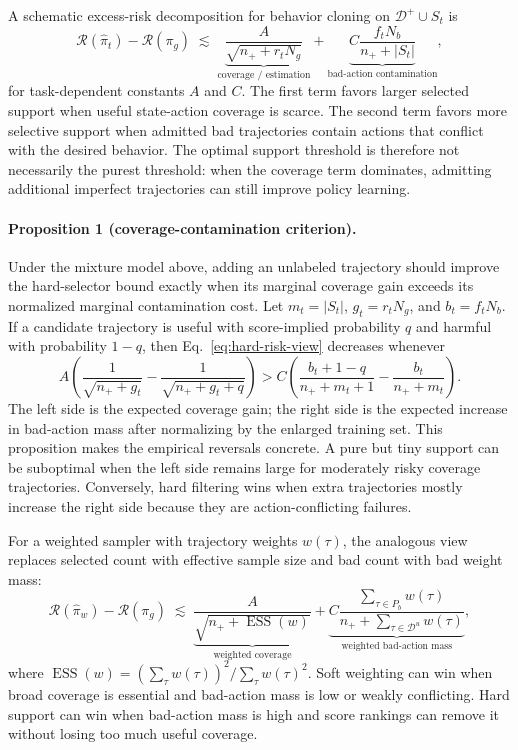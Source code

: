 \documentclass{article}
\newcommand{\Dpos}{\mathcal{D}^{+}}
\newcommand{\Dunl}{\mathcal{D}^{u}}
\begin{document}
A schematic excess-risk decomposition for behavior cloning on $\Dpos\cup S_t$ is
\begin{equation}
  \mathcal{R}(\hat{\pi}_t) - \mathcal{R}(\pi_g)
  \;\lesssim\;
  \underbrace{\frac{A}{\sqrt{n_+ + r_tN_g}}}_{\text{coverage / estimation}}
  +
  \underbrace{
  C\frac{f_tN_b}{n_+ + |S_t|}
  }_{\text{bad-action contamination}},
  \label{eq:hard-risk-view}
\end{equation}
for task-dependent constants $A$ and $C$. The first term favors larger selected support when useful state-action coverage is scarce. The second term favors more selective support when admitted bad trajectories contain actions that conflict with the desired behavior. The optimal support threshold is therefore not necessarily the purest threshold: when the coverage term dominates, admitting additional imperfect trajectories can still improve policy learning.

\paragraph{Proposition 1 (coverage-contamination criterion).}
Under the mixture model above, adding an unlabeled trajectory should improve the hard-selector bound exactly when its marginal coverage gain exceeds its normalized marginal contamination cost. Let $m_t=|S_t|$, $g_t=r_tN_g$, and $b_t=f_tN_b$. If a candidate trajectory is useful with score-implied probability $q$ and harmful with probability $1-q$, then Eq.~\ref{eq:hard-risk-view} decreases whenever
\begin{equation}
  A\left(
  \frac{1}{\sqrt{n_+ + g_t}} -
  \frac{1}{\sqrt{n_+ + g_t + q}}
  \right)
  >
  C\left(
  \frac{b_t + 1 - q}{n_+ + m_t + 1} -
  \frac{b_t}{n_+ + m_t}
  \right).
  \label{eq:marginal-support}
\end{equation}
The left side is the expected coverage gain; the right side is the expected increase in bad-action mass after normalizing by the enlarged training set. This proposition makes the empirical reversals concrete. A pure but tiny support can be suboptimal when the left side remains large for moderately risky coverage trajectories. Conversely, hard filtering wins when extra trajectories mostly increase the right side because they are action-conflicting failures.

For a weighted sampler with trajectory weights $w(\tau)$, the analogous view replaces selected count with effective sample size and bad count with bad weight mass:
\begin{equation}
  \mathcal{R}(\hat{\pi}_w) - \mathcal{R}(\pi_g)
  \;\lesssim\;
  \underbrace{\frac{A}{\sqrt{n_+ + \operatorname{ESS}(w)}}}_{\text{weighted coverage}}
  +
  \underbrace{
  C\frac{\sum_{\tau\in P_b}w(\tau)}
          {n_+ + \sum_{\tau\in\Dunl}w(\tau)}
  }_{\text{weighted bad-action mass}},
  \label{eq:weighted-risk-view}
\end{equation}
where $\operatorname{ESS}(w)=(\sum_\tau w(\tau))^2/\sum_\tau w(\tau)^2$. Soft weighting can win when broad coverage is essential and bad-action mass is low or weakly conflicting. Hard support can win when bad-action mass is high and score rankings can remove it without losing too much useful coverage.
\end{document}
